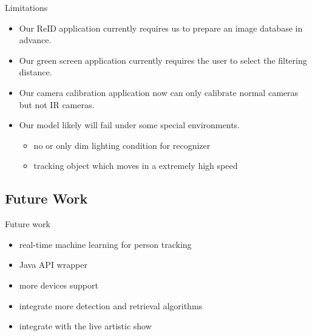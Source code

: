 \documentclass{beamer}
\begin{document}
\begin{frame}{Limitations}
    \begin{itemize}
    \item Our ReID application currently requires us to prepare an image 
    database in advance.
    \item Our green screen application currently requires the user
    to select the filtering distance.
    \item Our camera calibration application now can only calibrate normal 
    cameras but not IR cameras.
    \item Our model likely will fail under some special environments.
    \begin{itemize}
        \item no or only dim lighting condition for recognizer
        \item tracking object which moves in a extremely high speed
    \end{itemize}
    \end{itemize}
\end{frame}

\subsection{Future Work}

\begin{frame}{Future work}
    \begin{itemize}
        \item real-time machine learning for person tracking
        \item Java API wrapper
        \item more devices support
        \item integrate more detection and retrieval algorithms
        \item integrate with the live artistic show
    \end{itemize}
\end{frame}
\end{document}
